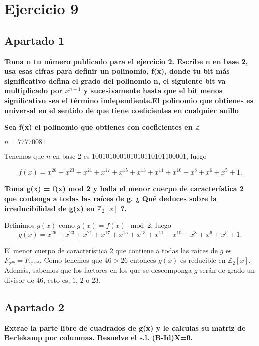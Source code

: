 \documentclass[a4paper]{article}
\title {\fbox{\Huge{\textbf{Ejercicio 9}}}}
\author {\fbox{Ana Buendía Ruiz-Azuaga}}
\begin{document}
\maketitle


\section{Ejercicio 9}

\subsection{Apartado 1}

\textbf{Toma n tu número publicado para el ejercicio 2. Escríbe n en base 2, usa esas cifras para definir un polinomio, f(x), donde tu bit más significativo defina el grado del polinomio n, el siguiente bit va multiplicado por $x^{n-1}$ y sucesivamente hasta que el bit menos significativo sea el término independiente.El polinomio que obtienes es universal en el sentido de que tiene coeficientes en cualquier anillo}

\textbf{Sea f(x) el polinomio que obtienes con coeficientes en $\mathbb{Z}$}

$n = 77770081$

Tenemos que $n$ en base 2 es 100101000101010110101100001, luego

$$f(x)=x^{26} + x^{23} + x^{21} + x^{17} + x^{15} + x^{13} + x^{11} + x^{10} + x^8 + x^6 + x^5 + 1.$$

\textbf{Toma g(x) = f(x) mod 2 y halla el menor cuerpo de característica 2 que contenga a todas las raíces de g. ¿ Qué deduces sobre la irreducibilidad de g(x) en $\mathbb{Z}_2[x]$ ?.}

Definimos $g(x)$ como $g(x)=f(x) \mod 2$, luego 
$$g(x)= x^{26} + x^{23} + x^{21} + x^{17} + x^{15} + x^{13} + x^{11} + x^{10} + x^8 + x^6 + x^5 + 1.$$

El menor cuerpo de característica 2 que contiene a todas las raíces de $g$ es $F_{2^{46}}=F_{2^{2\cdot 23}}$. Como tenemos que $46>26$ entonces $g(x)$ es reducible en $\mathbb{Z}_2[x]$. Además, sabemos que los factores en los que se descomponga $g$ serán de grado un divisor de $46$, esto es, $1$, $2$ o $23$. 


\subsection{Apartado 2}
\textbf{Extrae la parte libre de cuadrados de g(x) y le calculas su matriz de Berlekamp por columnas. Resuelve el s.l. (B-Id)X=0.}
\end{document}
